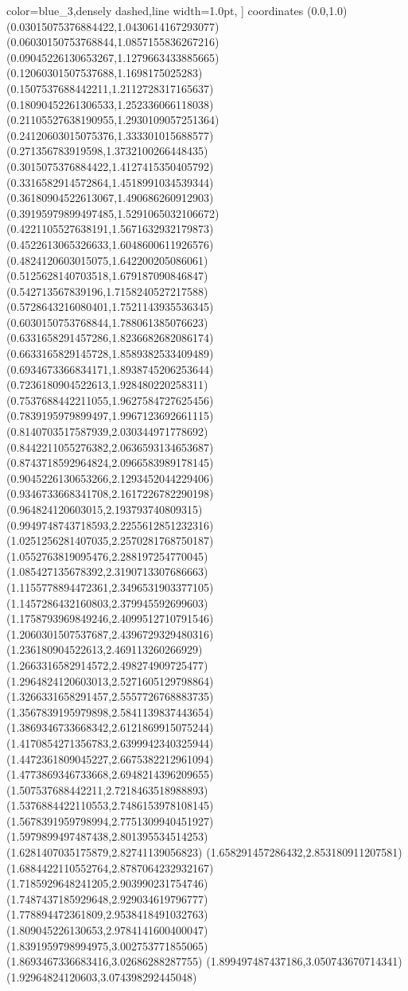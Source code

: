 color=blue_3,densely dashed,line width=1.0pt,
]
coordinates {%
(0.0,1.0)
(0.03015075376884422,1.0430614167293077)
(0.06030150753768844,1.0857155836267216)
(0.09045226130653267,1.1279663433885665)
(0.12060301507537688,1.1698175025283)
(0.1507537688442211,1.2112728317165637)
(0.18090452261306533,1.252336066118038)
(0.21105527638190955,1.2930109057251364)
(0.24120603015075376,1.333301015688577)
(0.271356783919598,1.3732100266448435)
(0.3015075376884422,1.4127415350405792)
(0.3316582914572864,1.4518991034539344)
(0.36180904522613067,1.490686260912903)
(0.39195979899497485,1.5291065032106672)
(0.4221105527638191,1.5671632932179873)
(0.4522613065326633,1.6048600611926576)
(0.4824120603015075,1.642200205086061)
(0.5125628140703518,1.679187090846847)
(0.542713567839196,1.7158240527217588)
(0.5728643216080401,1.7521143935536345)
(0.6030150753768844,1.788061385076623)
(0.6331658291457286,1.8236682682086174)
(0.6633165829145728,1.8589382533409489)
(0.6934673366834171,1.8938745206253644)
(0.7236180904522613,1.928480220258311)
(0.7537688442211055,1.9627584727625456)
(0.7839195979899497,1.9967123692661115)
(0.8140703517587939,2.030344971778692)
(0.8442211055276382,2.0636593134653687)
(0.8743718592964824,2.0966583989178145)
(0.9045226130653266,2.1293452044229406)
(0.9346733668341708,2.1617226782290198)
(0.964824120603015,2.193793740809315)
(0.9949748743718593,2.2255612851232316)
(1.0251256281407035,2.2570281768750187)
(1.0552763819095476,2.288197254770045)
(1.085427135678392,2.3190713307686663)
(1.1155778894472361,2.3496531903377105)
(1.1457286432160803,2.379945592699603)
(1.1758793969849246,2.4099512710791546)
(1.2060301507537687,2.4396729329480316)
(1.236180904522613,2.469113260266929)
(1.2663316582914572,2.498274909725477)
(1.2964824120603013,2.5271605129798864)
(1.3266331658291457,2.5557726768883735)
(1.3567839195979898,2.5841139837443654)
(1.3869346733668342,2.6121869915075244)
(1.4170854271356783,2.6399942340325944)
(1.4472361809045227,2.6675382212961094)
(1.4773869346733668,2.6948214396209655)
(1.507537688442211,2.7218463518988893)
(1.5376884422110553,2.7486153978108145)
(1.5678391959798994,2.7751309940451927)
(1.5979899497487438,2.801395534514253)
(1.6281407035175879,2.82741139056823)
(1.658291457286432,2.853180911207581)
(1.6884422110552764,2.8787064232932167)
(1.7185929648241205,2.903990231754746)
(1.7487437185929648,2.929034619796777)
(1.778894472361809,2.9538418491032763)
(1.809045226130653,2.9784141600400047)
(1.8391959798994975,3.002753771855065)
(1.8693467336683416,3.02686288287755)
(1.899497487437186,3.050743670714341)
(1.92964824120603,3.074398292445048)
}

